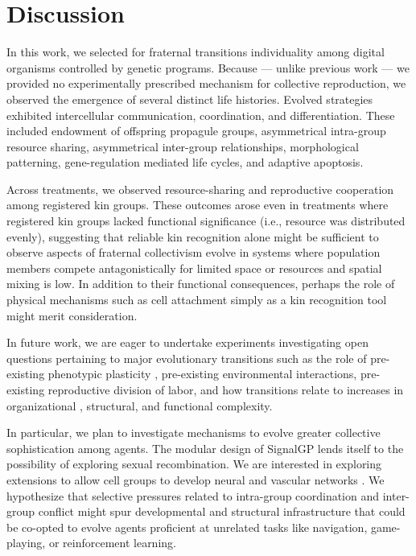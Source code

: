 \section{Discussion}


In this work, we selected for fraternal transitions individuality among digital organisms controlled by genetic programs.
Because --- unlike previous work --- we provided no experimentally prescribed mechanism for collective reproduction, we observed the emergence of several distinct life histories.
Evolved strategies exhibited intercellular communication, coordination, and differentiation.
These included endowment of offspring propagule groups, asymmetrical intra-group resource sharing, asymmetrical inter-group relationships, morphological patterning, gene-regulation mediated life cycles, and adaptive apoptosis.

Across treatments, we observed resource-sharing and reproductive cooperation among registered kin groups.
These outcomes arose even in treatments where registered kin groups lacked functional significance (i.e., resource was distributed evenly), suggesting that reliable kin recognition alone might be sufficient to observe aspects of fraternal collectivism evolve in systems where population members compete antagonistically for limited space or resources and spatial mixing is low.
In addition to their functional consequences, perhaps the role of physical mechanisms such as cell attachment simply as a kin recognition tool might merit consideration.

In future work, we are eager to undertake experiments investigating open questions pertaining to major evolutionary transitions such as the role of pre-existing phenotypic plasticity \citep{clune2007investigating, lalejini2016evolutionary}, pre-existing environmental interactions, pre-existing reproductive division of labor, and how transitions relate to increases in organizational \citep{goldsby2012task}, structural, and functional \citep{goldsby2014evolutionary} complexity.

In particular, we plan to investigate mechanisms to evolve greater collective sophistication among agents.
The modular design of SignalGP lends itself to the possibility of exploring sexual recombination.
We are interested in exploring extensions to allow cell groups to develop neural and vascular networks \citep{Moreno_Ofria_2020}.
We hypothesize that selective pressures related to intra-group coordination and inter-group conflict might spur developmental and structural infrastructure that could be co-opted to evolve agents proficient at unrelated tasks like navigation, game-playing, or reinforcement learning.

